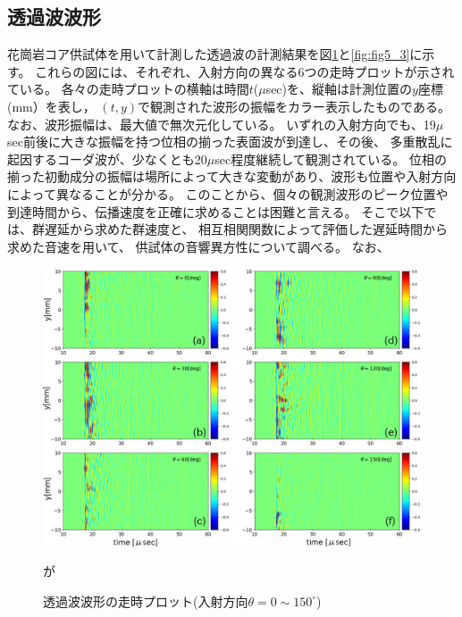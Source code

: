 \subsection{透過波波形}
花崗岩コア供試体を用いて計測した透過波の計測結果を図\ref{fig:fig5_2}と\ref{fig:fig5_3}に示す。
これらの図には、それぞれ、入射方向の異なる6つの走時プロットが示されている。
各々の走時プロットの横軸は時間$t$($\mu$sec)を、縦軸は計測位置の$y$座標(mm）を表し，
$(t,y)$で観測された波形の振幅をカラー表示したものである。
なお、波形振幅は、最大値で無次元化している。
いずれの入射方向でも、19$\mu$sec前後に大きな振幅を持つ位相の揃った表面波が到達し、その後、
多重散乱に起因するコーダ波が、少なくとも20$\mu$sec程度継続して観測されている。
位相の揃った初動成分の振幅は場所によって大きな変動があり、波形も位置や入射方向によって異なることが分かる。
このことから、個々の観測波形のピーク位置や到達時間から、伝播速度を正確に求めることは困難と言える。
そこで以下では、群遅延から求めた群速度と、
相互相関関数によって評価した遅延時間から求めた音速を用いて、
供試体の音響異方性について調べる。
なお、
\begin{figure}[h]
	\begin{center}
	\includegraphics[width=1.0\linewidth]{Figs/fig5_2.eps} 
	\end{center}
	\caption{
		透過波波形の走時プロット(入射方向$\theta=0\sim 150^{\circ}$)
	} 
	\label{fig:fig5_2}が
\end{figure}
